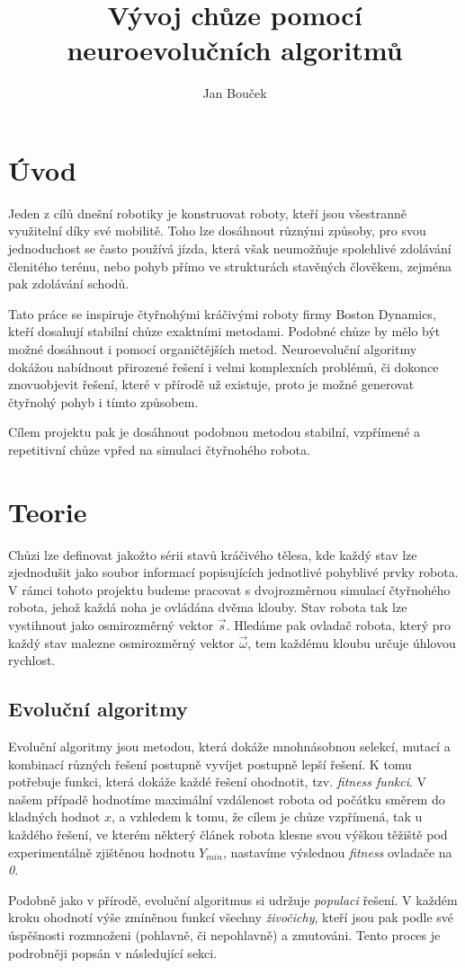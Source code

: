 \documentclass[a4]{article}
\begin{document}
\title{Vývoj chůze pomocí neuroevolučních algoritmů} 
\author{Jan Bouček} 
\date{} 
\maketitle 
 
\section{Úvod} 
Jeden z cílů dnešní robotiky je konstruovat roboty, kteří jsou všestranně využitelní díky své mobilitě. Toho lze dosáhnout různými způsoby, pro svou jednoduchost se často používá jízda, která však neumožňuje spolehlivé zdolávání členitého terénu, nebo pohyb přímo ve strukturách stavěných člověkem, zejména pak zdolávání schodů.\par
Tato práce se inspiruje čtyřnohými kráčivými roboty firmy Boston Dynamics\cite{bostondynamics}, kteří dosahují stabilní chůze exaktními metodami.\cite{bdpaper} Podobné chůze by mělo být možné dosáhnout i pomocí organičtějších metod. Neuroevoluční algoritmy dokážou nabídnout přirozené řešení i velmi komplexních problémů, či dokonce znovuobjevit řešení, které v přírodě už existuje, proto je možné generovat čtyřnohý pohyb i tímto způsobem.\cite{clunegait}\par
Cílem projektu pak je dosáhnout podobnou metodou stabilní, vzpřímené a repetitivní chůze vpřed na simulaci čtyřnohého robota.
 
\section{Teorie}
Chůzi lze definovat jakožto sérii stavů kráčivého tělesa, kde každý stav lze zjednodušit jako soubor informací popisujících jednotlivé pohyblivé prvky robota. V rámci tohoto projektu budeme pracovat s dvojrozměrnou simulací čtyřnohého robota, jehož každá noha je ovládána dvěma klouby. Stav robota tak lze vystihnout jako osmirozměrný vektor $\vec{s}$. Hledáme pak ovladač robota, který pro každý stav malezne osmirozměrný vektor $\vec{\omega}$, tem každému kloubu určuje úhlovou rychlost.
\subsection{Evoluční algoritmy}
Evoluční algoritmy jsou metodou, která dokáže mnohnásobnou selekcí, mutací a kombinací různých řešení postupně vyvíjet postupně lepší řešení. K tomu potřebuje funkci, která dokáže každé řešení ohodnotit, tzv. \emph{fitness funkci}. V našem případě hodnotíme maximální vzdálenost robota od počátku směrem do kladných hodnot $x$, a vzhledem k tomu, že cílem je chůze vzpřímená, tak u každého řešení, ve kterém některý článek robota klesne svou výškou těžiště pod experimentálně zjištěnou hodnotu $Y_{min}$, nastavíme výslednou \emph{fitness} ovladače na \emph{0}.\par
Podobně jako v přírodě, evoluční algoritmus si udržuje \emph{populaci} řešení. V každém kroku ohodnotí výše zmíněnou funkcí všechny \emph{živočichy}, kteří jsou pak podle své úspěšnosti rozmnoženi (pohlavně, či nepohlavně) a zmutováni. Tento proces je podrobněji popsán v následující sekci.
\end{document}
